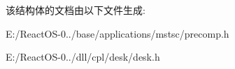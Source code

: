 该结构体的文档由以下文件生成\+:\begin{DoxyCompactItemize}
\item 
E\+:/\+React\+O\+S-\/0../base/applications/mstsc/precomp.\+h\item 
E\+:/\+React\+O\+S-\/0../dll/cpl/desk/desk.\+h\end{DoxyCompactItemize}

